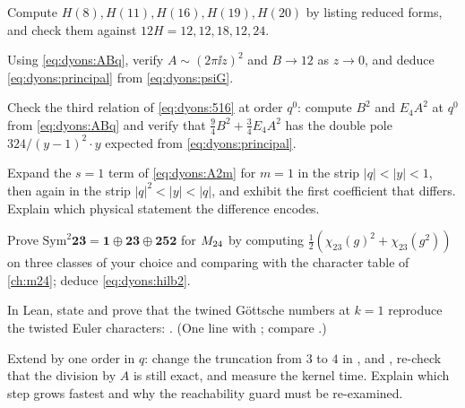 \begin{exercise}[$\star$]\label{exo:dyons:hurwitz}
Compute $H(8),H(11),H(16),H(19),H(20)$ by listing reduced forms, and check them against
$12H=12,12,18,12,24$.
\end{exercise}

\begin{exercise}[$\star$]\label{exo:dyons:limit}
Using \eqref{eq:dyons:ABq}, verify $A\sim(2\pi\ii z)^2$ and $B\to12$ as $z\to0$, and deduce
\eqref{eq:dyons:principal} from \eqref{eq:dyons:psiG}.
\end{exercise}

\begin{exercise}[$\star\star$]\label{exo:dyons:516}
Check the third relation of \eqref{eq:dyons:516} at order $q^0$: compute $B^2$ and $E_4A^2$ at
$q^0$ from \eqref{eq:dyons:ABq} and verify that $\tfrac94B^2+\tfrac34E_4A^2$ has the double
pole $324/(y-1)^2\cdot y$ expected from \eqref{eq:dyons:principal}.
\end{exercise}

\begin{exercise}[$\star\star$]\label{exo:dyons:strip}
Expand the $s=1$ term of \eqref{eq:dyons:A2m} for $m=1$ in the strip $|q|<|y|<1$, then again in
the strip $|q|^2<|y|<|q|$, and exhibit the first coefficient that differs. Explain which
physical statement the difference encodes.
\end{exercise}

\begin{exercise}[$\star\star$]\label{exo:dyons:sym2}
Prove $\mathrm{Sym}^2\mathbf{23}=\mathbf1\oplus\mathbf{23}\oplus\mathbf{252}$ for $M_{24}$ by
computing $\tfrac12(\chi_{23}(g)^2+\chi_{23}(g^2))$ on three classes of your choice and
comparing with the character table of \cref{ch:m24}; deduce \eqref{eq:dyons:hilb2}.
\end{exercise}

\begin{exercise}[$\star\star$]\label{exo:dyons:lean1}
In Lean, state and prove that the twined Göttsche numbers at $k=1$ reproduce the twisted Euler
characters: . (One line with
; compare .)
\end{exercise}

\begin{exercise}[$\star\star\star$]\label{exo:dyons:lean2}
Extend  by one order in $q$: change the truncation from $3$ to $4$ in
,  and , re-check that the division by $A$
is still exact, and measure the kernel time. Explain which step grows fastest and why the
reachability guard must be re-examined.
\end{exercise}

